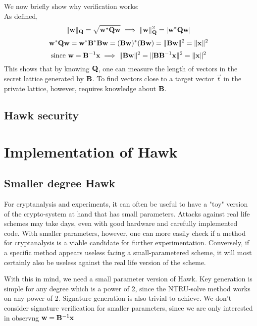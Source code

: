 We now briefly show why verification works: \\
As defined, 
\[
    \lVert \mathbf{w} \rVert_{\mathbf{Q}} = \sqrt{\mathbf{w}^* \mathbf{Q} \mathbf{w}} \implies \lVert \mathbf{w} \rVert_{\mathbf{Q}} ^2 = |\mathbf{w}^* \mathbf{Q} \mathbf{w}| \\
\]
\[
    \mathbf{w}^* \mathbf{Q} \mathbf{w} = \mathbf{w}^* \mathbf{B}^* \mathbf{B} \mathbf{w} = (\mathbf{B} \mathbf{w})^* (\mathbf{B} \mathbf{w}) = \lVert \mathbf{B} \mathbf{w} \rVert ^2
    = \lVert \mathbf{x} \rVert ^2
\]
\[
    \text{since } \mathbf{w} = \mathbf{B}^{-1} \mathbf{x} \implies \lVert \mathbf{B} \mathbf{w} \rVert ^2 = \lVert \mathbf{B} \mathbf{B}^{-1} \mathbf{x} \rVert ^2 = \lVert \mathbf{x} \rVert ^2
\]
This shows that by knowing $\mathbf{Q}$, one can measure the length of vectors in the secret lattice generated by $\mathbf{B}$. To find vectors close to a target vector $\vec{t}$ 
in the private lattice, however, requires knowledge about $\mathbf{B}$.
\subsection{Hawk security}
\section{Implementation of Hawk}
\subsection{Smaller degree Hawk}
For cryptanalysis and experiments, it can often be useful to have a "toy" version of the crypto-system at hand that has small parameters. Attacks against real life schemes may take days, even with good hardware and carefully implemented code. 
With smaller parameters, however, one can more easily check if a method for cryptanalysis is a viable candidate for further experimentation. Conversely, if a specific method appears useless facing a small-parametered scheme, it will most certainly
also be useless against the real life version of the scheme.

With this in mind, we need a small parameter version of Hawk.
Key generation is simple for any degree which is a power of 2, since the NTRU-solve method works on any power of 2.
Signature generation is also trivial to achieve. We don't consider signature verification for smaller parameters, since we are only interested in observng $\mathbf{w} = \mathbf{B}^{-1} \mathbf{x}$
